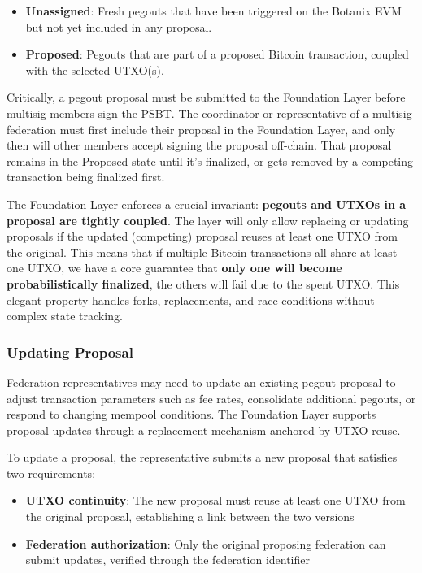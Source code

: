 \begin{itemize}
    \item \textbf{Unassigned}: Fresh pegouts that have been triggered on the Botanix EVM but not yet included in any proposal.
    \item \textbf{Proposed}: Pegouts that are part of a proposed Bitcoin transaction, coupled with the selected UTXO(s).
\end{itemize}

Critically, a pegout proposal must be submitted to the Foundation Layer before multisig members sign the PSBT. The coordinator or representative of a multisig federation must first include their proposal in the Foundation Layer, and only then will other members accept signing the proposal off-chain. That proposal remains in the Proposed state until it's finalized, or gets removed by a competing transaction being finalized first.

The Foundation Layer enforces a crucial invariant: \textbf{pegouts and UTXOs in a proposal are tightly coupled}. The layer will only allow replacing or updating proposals if the updated (competing) proposal reuses at least one UTXO from the original. This means that if multiple Bitcoin transactions all share at least one UTXO, we have a core guarantee that \textbf{only one will become probabilistically finalized}, the others will fail due to the spent UTXO. This elegant property handles forks, replacements, and race conditions without complex state tracking.

\subsubsection{Updating Proposal}
\label{sec:pegout-proposal-upgrade}

Federation representatives may need to update an existing pegout proposal to adjust transaction parameters such as fee rates, consolidate additional pegouts, or respond to changing mempool conditions. The Foundation Layer supports proposal updates through a replacement mechanism anchored by UTXO reuse.

To update a proposal, the representative submits a new proposal that satisfies two requirements:

\begin{itemize}
    \item \textbf{UTXO continuity}: The new proposal must reuse at least one UTXO from the original proposal, establishing a link between the two versions
    \item \textbf{Federation authorization}: Only the original proposing federation can submit updates, verified through the federation identifier
\end{itemize}

